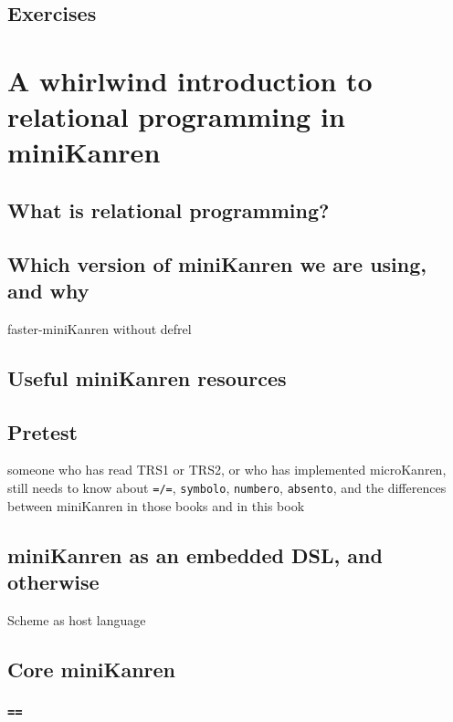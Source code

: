 \documentclass{book}
\begin{document}
\section{Exercises}



\chapter{A whirlwind introduction to relational programming in miniKanren}%

\section{What is relational programming?}

\section{Which version of miniKanren we are using, and why}

faster-miniKanren without defrel

\section{Useful miniKanren resources}

\section{Pretest}

someone who has read TRS1 or TRS2, or who has implemented microKanren,
still needs to know about \texttt{=/=}, \texttt{symbolo},
\texttt{numbero}, \texttt{absento}, and the differences between
miniKanren in those books and in this book

\section{miniKanren as an embedded DSL, and otherwise}

Scheme as host language

\section{Core miniKanren}

\subsection{\texttt{==}}
\end{document}
